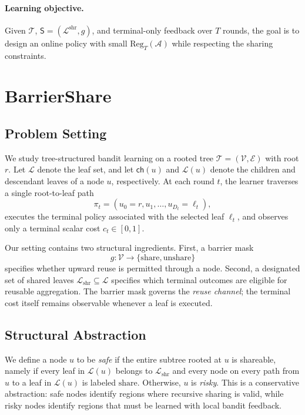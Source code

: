 \documentclass{article}
\begin{document}
\paragraph{Learning objective.}
Given \(\mathcal{T}\), \(\mathsf{S}=(\mathcal{L}^{\mathrm{shr}}, g)\), and terminal-only feedback over \(T\) rounds, the goal is to design an online policy with small \(\mathrm{Reg}_T(\mathcal{A})\) while respecting the sharing constraints.
\section{BarrierShare}
\label{sec:barriershare}

\subsection{Problem Setting}
\label{sec:barriershare_problem}

We study tree-structured bandit learning on a rooted tree $\mathcal{T}=(\mathcal{V},\mathcal{E})$ with root $r$. Let $\mathcal{L}$ denote the leaf set, and let $\mathsf{ch}(u)$ and $\mathcal{L}(u)$ denote the children and descendant leaves of a node $u$, respectively. At each round $t$, the learner traverses a single root-to-leaf path
\begin{equation}
    \pi_t = (u_0=r, u_1, \ldots, u_{D_t}=\ell_t),
\end{equation}
executes the terminal policy associated with the selected leaf $\ell_t$, and observes only a terminal scalar cost $c_t \in [0,1]$.

Our setting contains two structural ingredients. First, a barrier mask
\begin{equation}
    g:\mathcal{V}\rightarrow\{\mathrm{share},\mathrm{unshare}\}
\end{equation}
specifies whether upward reuse is permitted through a node. Second, a designated set of shared leaves $\mathcal{L}_{\mathrm{shr}}\subseteq \mathcal{L}$ specifies which terminal outcomes are eligible for reusable aggregation. The barrier mask governs the \emph{reuse channel}; the terminal cost itself remains observable whenever a leaf is executed.

\subsection{Structural Abstraction}
\label{sec:barriershare_structure}

We define a node $u$ to be \emph{safe} if the entire subtree rooted at $u$ is shareable, namely if every leaf in $\mathcal{L}(u)$ belongs to $\mathcal{L}_{\mathrm{shr}}$ and every node on every path from $u$ to a leaf in $\mathcal{L}(u)$ is labeled $\mathrm{share}$. Otherwise, $u$ is \emph{risky}. This is a conservative abstraction: safe nodes identify regions where recursive sharing is valid, while risky nodes identify regions that must be learned with local bandit feedback.
\end{document}
